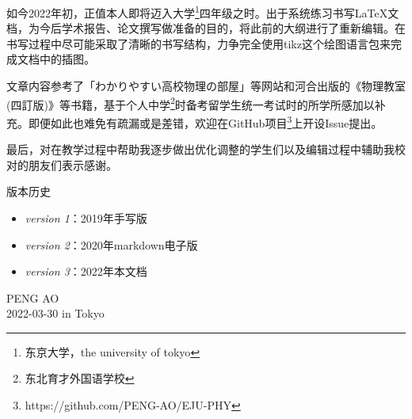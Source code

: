 如今2022年初，正值本人即将迈入大学\footnote{东京大学，the university of tokyo}四年级之时。出于系统练习书写\LaTeX 文档，为今后学术报告、论文撰写做准备的目的，将此前的大纲进行了重新编辑。在书写过程中尽可能采取了清晰的书写结构，力争完全使用tikz这个绘图语言包来完成文档中的插图。

文章内容参考了「わかりやすい高校物理の部屋」等网站和河合出版的《物理教室(四訂版)》等书籍，基于个人中学\footnote{东北育才外国语学校}时备考留学生统一考试时的所学所感加以补充。即便如此也难免有疏漏或是差错，欢迎在GitHub项目\footnote{https://github.com/PENG-AO/EJU-PHY}上开设Issue提出。

最后，对在教学过程中帮助我逐步做出优化调整的学生们以及编辑过程中辅助我校对的朋友们表示感谢。

\vfill
版本历史
\begin{itemize}
    \item \textit{version 1}：2019年手写版
    \item \textit{version 2}：2020年markdown电子版
    \item \textit{version 3}：2022年本文档
\end{itemize}

\vfill
\begin{flushright}
    PENG AO\\
    2022-03-30 in Tokyo
\end{flushright}


\clearpage
\tableofcontents
